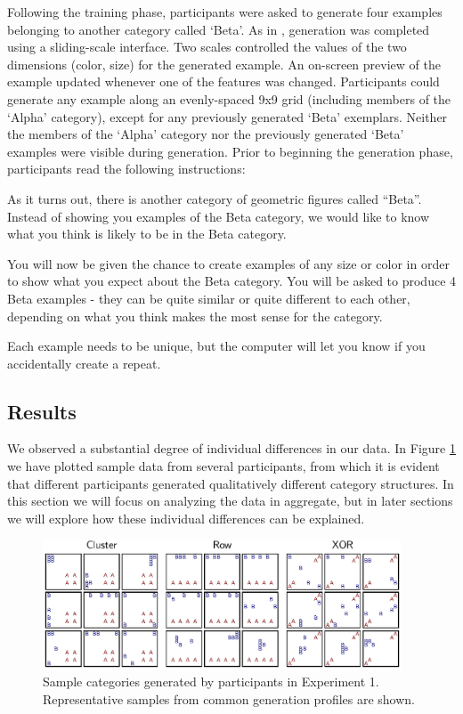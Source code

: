 \documentclass[pdflatex,sn-apa]{sn-jnl}%
\theoremstyle{thmstyleone}%
\theoremstyle{thmstyletwo}%
\theoremstyle{thmstylethree}%
\begin{document}
Following the training phase, participants were asked to generate four examples
belonging to another category called `Beta'. As in
\citet{jern2013probabilistic}, generation was completed using a sliding-scale
interface. Two scales controlled the values of the two dimensions (color, size)
for the generated example. An on-screen preview of the example updated whenever
one of the features was changed. Participants could generate any example along
an evenly-spaced 9x9 grid (including members of the `Alpha' category), except for
any previously generated `Beta' exemplars. Neither the members of the `Alpha'
category nor the previously generated `Beta' examples were visible during
generation. Prior to beginning the generation phase, participants read the
following instructions:

\begin{displayquote} As it turns out, there is another category of geometric
figures called ``Beta''. Instead of showing you examples of the Beta category,
we would like to know what you think is likely to be in the Beta category.

You will now be given the chance to create examples of any size or color in
order to show what you expect about the Beta category. You will be asked to
produce 4 Beta examples - they can be quite similar or quite different to each
other, depending on what you think makes the most sense for the category.

Each example needs to be unique, but the computer will let you know if you
accidentally create a repeat.
\end{displayquote}

\subsection{Results}

We observed a substantial degree of individual differences in our data. In
Figure \ref{fig:e1-samples} we have plotted sample data from several
participants, from which it is evident that different participants generated
qualitatively different category structures. In this section we will focus on
analyzing the data in aggregate, but in later sections we will explore how these
individual differences can be explained.

\begin{figure}
    \begin{center} \includegraphics[width=0.95\textwidth]{figs/e1-samples.eps}
    \caption{Sample categories generated by participants in Experiment 1.
Representative samples from common generation profiles are shown.}
    \label{fig:e1-samples}
    \end{center}
\end{figure}
\end{document}
